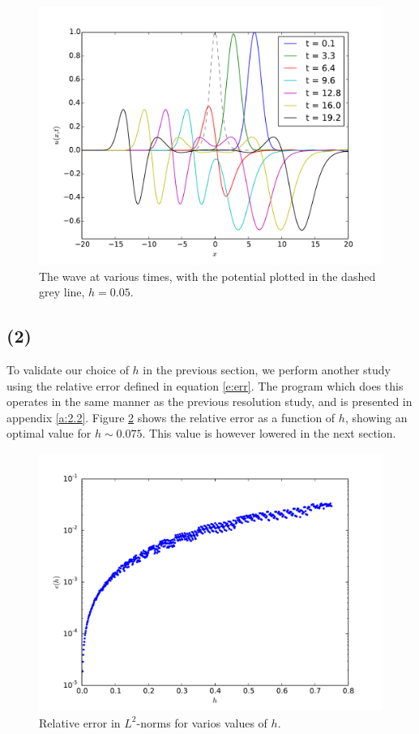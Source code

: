 \documentclass[10pt]{article}
\begin{document}
\begin{figure}
  \centering
  \includegraphics[width=\textwidth]{2/cosh.pdf}
  \caption{The wave at various times, with the potential plotted in the dashed grey line, $h=0.05$.}
  \label{f:cosh}
\end{figure}


\clearpage
\subsection*{(2)}
To validate our choice of $h$ in the previous section, we perform another study using
the relative error defined in equation \ref{e:err}.
The program which does this operates in the same manner as the previous resolution study,
and is presented in appendix \ref{a:2.2}.
Figure \ref{f:hstudy2} shows the relative error as a function of $h$, showing an optimal
value for $h \sim 0.075$. This value is however lowered in the next section.

\begin{figure}
  \centering
  \includegraphics[width=\textwidth]{2/epsilon.pdf}
  \caption{Relative error in $L^2$-norms for varios values of $h$.}
  \label{f:hstudy2}
\end{figure}
\end{document}
